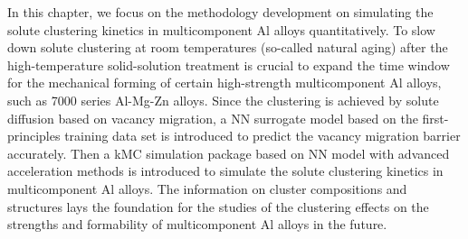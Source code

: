 In this chapter, we focus on the methodology development on simulating the solute clustering kinetics in multicomponent Al alloys quantitatively. To slow down solute clustering at room temperatures (so-called natural aging) after the high-temperature solid-solution treatment is crucial to expand the time window for the mechanical forming of certain high-strength multicomponent Al alloys, such as 7000 series Al-Mg-Zn alloys. Since the clustering is achieved by solute diffusion based on vacancy migration, a \acf{NN} surrogate model based on the first-principles training data set is introduced to predict the vacancy migration barrier accurately. Then a \acf{kMC} simulation package based on \ac{NN} model with advanced acceleration methods is introduced to simulate the solute clustering kinetics in multicomponent Al alloys. The information on cluster compositions and structures lays the foundation for the studies of the clustering effects on the strengths and formability of multicomponent Al alloys in the future.





